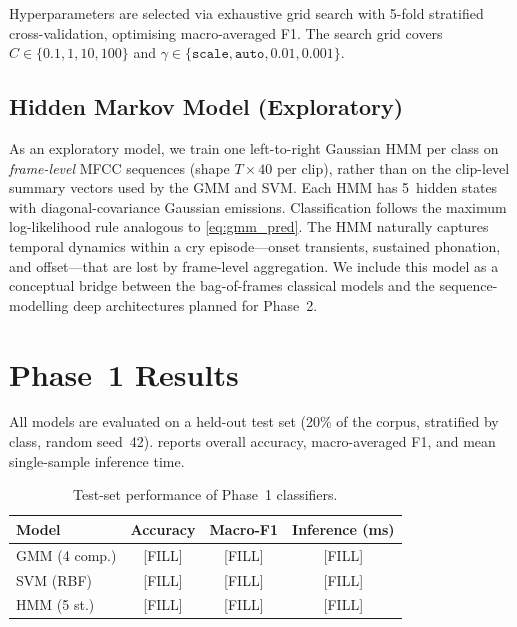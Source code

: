 \documentclass[conference]{IEEEtran}
\begin{document}
Hyperparameters are selected via exhaustive grid search with 5-fold
stratified cross-validation, optimising macro-averaged F1.  The search
grid covers $C \in \{0.1, 1, 10, 100\}$ and
$\gamma \in \{\texttt{scale}, \texttt{auto}, 0.01, 0.001\}$.

\subsection{Hidden Markov Model (Exploratory)}
\label{sec:hmm}

As an exploratory model, we train one left-to-right Gaussian HMM per
class on \emph{frame-level} MFCC sequences (shape $T \times 40$ per
clip), rather than on the clip-level summary vectors used by the GMM and
SVM.  Each HMM has 5~hidden states with diagonal-covariance Gaussian
emissions.  Classification follows the maximum log-likelihood rule
analogous to \cref{eq:gmm_pred}.  The HMM naturally captures temporal
dynamics within a cry episode---onset transients, sustained phonation,
and offset---that are lost by frame-level aggregation.  We include this
model as a conceptual bridge between the bag-of-frames classical models
and the sequence-modelling deep architectures planned for Phase~2.

\section{Phase~1 Results}
\label{sec:results}

All models are evaluated on a held-out test set (20\% of the corpus,
stratified by class, random seed~42).   reports
overall accuracy, macro-averaged F1, and mean single-sample inference
time.

\begin{table}[t]
  \centering
  \caption{Test-set performance of Phase~1 classifiers.}
  \label{tab:results}
  \begin{tabular}{lccc}
    \toprule
    \textbf{Model} & \textbf{Accuracy} & \textbf{Macro-F1} &
      \textbf{Inference (ms)} \\
    \midrule
    GMM (4 comp.) & [FILL] & [FILL] & [FILL] \\
    SVM (RBF)     & [FILL] & [FILL] & [FILL] \\
    HMM (5 st.)   & [FILL] & [FILL] & [FILL] \\
    \bottomrule
  \end{tabular}
\end{table}
\end{document}
